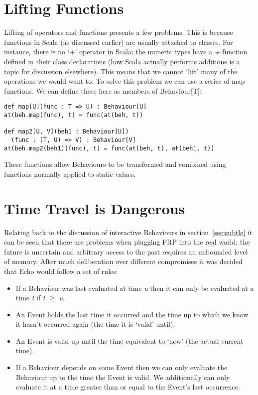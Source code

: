     \section{Lifting Functions}
    Lifting of operators and
    functions presents a few problems. This is because functions in Scala (as discussed earlier)
    are usually attached to classes. For instance, there is no `+' operator in Scala: the numeric
    types have a \emph{+} function defined in their class declarations (how Scala actually performs additions
    is a topic for discussion elsewhere). This means that we cannot `lift' many of the operations we
    would want to. To solve this problem we can use a series of map functions. We can define these
    here as members of Behaviour[T]:

\begin{verbatim}
def map[U](func : T => U) : Behaviour[U]
at(beh.map(func), t) = func(at(beh, t))

def map2[U, V](beh1 : Behaviour[U])
  (func : (T, U) => V) : Behaviour[V]
at(beh.map2(beh1)(func), t) = func(at(beh, t), at(beh1, t))
\end{verbatim}        

    These functions allow Behaviours to be transformed and combined using functions
    normally applied to static values.

  \section{Time Travel is Dangerous}
    \label{sec:time}
    Relating back to the discussion of interactive Behaviours in section~\ref{sec:subtle} it can be seen
    that there are problems when plugging FRP into the real world: the future is uncertain and
    arbitrary access to the past requires an unbounded level of memory. After much deliberation
    over different compromises it was decided that Echo would follow a set of rules:
    
    \begin{itemize}
      \item If a Behaviour was last evaluated at time \emph{u} then it can only be evaluated at
      a time \emph{t} if \emph{t} $\geq$ \emph{u}.
      \item An Event holds the last time it occurred and the time up to which we know it hasn't occurred
      again (the time it is `valid' until).
      \item An Event is valid up until the time equivalent to `now' (the actual current time).
      \item If a Behaviour depends on some Event then we can only evaluate the Behaviour up to
      the time the Event is valid. We additionally can only evaluate it at a time greater than
      or equal to the Event's last occurrence.
    \end{itemize}
    
